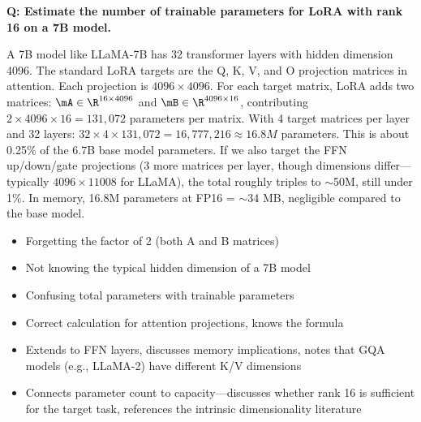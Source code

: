 \begin{interviewq}
\textbf{Q: Estimate the number of trainable parameters for LoRA with rank 16 on a 7B model.}

 \quad {} \quad \badgefreq{\freqhigh}

\stronganswer A 7B model like LLaMA-7B has 32 transformer layers with hidden dimension 4096. The standard LoRA targets are the Q, K, V, and O projection matrices in attention. Each projection is $4096 \times 4096$. For each target matrix, LoRA adds two matrices: $\mA \in \R^{16 \times 4096}$ and $\mB \in \R^{4096 \times 16}$, contributing $2 \times 4096 \times 16 = 131{,}072$ parameters per matrix. With 4 target matrices per layer and 32 layers: $32 \times 4 \times 131{,}072 = 16{,}777{,}216 \approx 16.8M$ parameters. This is about 0.25\% of the 6.7B base model parameters. If we also target the FFN up/down/gate projections (3 more matrices per layer, though dimensions differ---typically $4096 \times 11008$ for LLaMA), the total roughly triples to $\sim$50M, still under 1\%. In memory, 16.8M parameters at FP16 = $\sim$34 MB, negligible compared to the base model.

\redflags
\begin{itemize}
    \item Forgetting the factor of 2 (both A and B matrices)
    \item Not knowing the typical hidden dimension of a 7B model
    \item Confusing total parameters with trainable parameters
\end{itemize}


\goodgreat
\begin{itemize}
    \item {} Correct calculation for attention projections, knows the formula
    \item {} Extends to FFN layers, discusses memory implications, notes that GQA models (e.g., LLaMA-2) have different K/V dimensions
    \item {} Connects parameter count to capacity---discusses whether rank 16 is sufficient for the target task, references the intrinsic dimensionality literature
\end{itemize}

\end{interviewq}

